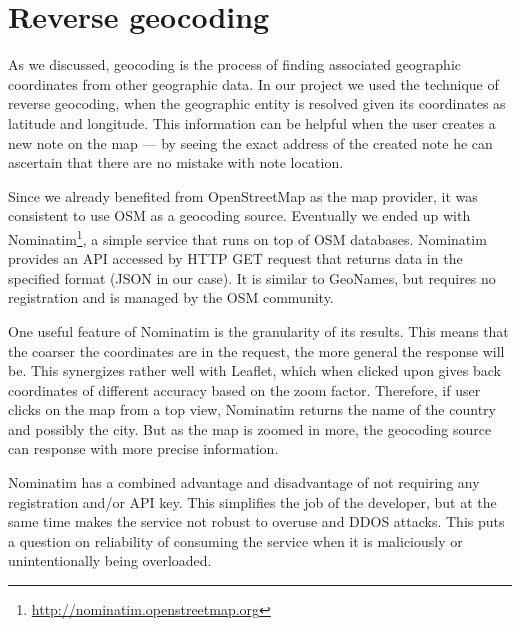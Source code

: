 \documentclass[12pt,a4paper]{article}
\begin{document}
\section{Reverse geocoding}

As we discussed, geocoding is the process of finding associated
geographic coordinates from other geographic data. In our project we
used the technique of reverse geocoding, when the geographic entity is
resolved given its coordinates as latitude and longitude. This
information can be helpful when the user creates a new note on the map
--- by seeing the exact address of the created note he can ascertain
that there are no mistake with note location.

Since we already benefited from OpenStreetMap as the map provider, it was
consistent to use OSM as a geocoding source. Eventually we ended up with
Nominatim\footnote{\url{http://nominatim.openstreetmap.org}}, a simple service
that runs on top of OSM databases. Nominatim provides an API accessed by HTTP
GET request that returns data in the specified format (JSON in our case). It is
similar to GeoNames, but requires no registration and is managed by the OSM
community.

One useful feature of Nominatim is the granularity of its results. This means
that the coarser the coordinates are in the request, the more general the
response will be. This synergizes rather well with Leaflet, which when clicked
upon gives back coordinates of different accuracy based on the zoom factor.
Therefore, if user clicks on the map from a top view, Nominatim returns the name
of the country and possibly the city. But as the map is zoomed in more, the
geocoding source can response with more precise information.

Nominatim has a combined advantage and disadvantage of not requiring any
registration and/or API key. This simplifies the job of the developer, but at
the same time makes the service not robust to overuse and DDOS attacks. This
puts a question on reliability of consuming the service when it is maliciously
or unintentionally being overloaded.
\end{document}
